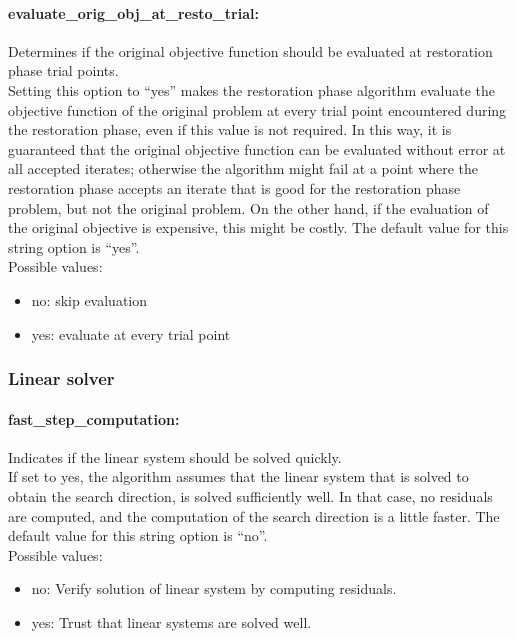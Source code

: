 \paragraph{evaluate\_orig\_obj\_at\_resto\_trial:} Determines if the original objective function should be evaluated at restoration phase trial points. $\;$ \\
 Setting this option to ``yes'' makes the
restoration phase algorithm evaluate the
objective function of the original problem at
every trial point encountered during the
restoration phase, even if this value is not
required.  In this way, it is guaranteed that the
original objective function can be evaluated
without error at all accepted iterates; otherwise
the algorithm might fail at a point where the
restoration phase accepts an iterate that is good
for the restoration phase problem, but not the
original problem.  On the other hand, if the
evaluation of the original objective is
expensive, this might be costly.
The default value for this string option is ``yes''.
\\ 
Possible values:
\begin{itemize}
   \item no: skip evaluation
   \item yes: evaluate at every trial point
\end{itemize}

\subsubsection{Linear solver}

\paragraph{fast\_step\_computation:} Indicates if the linear system should be solved quickly. $\;$ \\
 If set to yes, the algorithm assumes that the
linear system that is solved to obtain the search
direction, is solved sufficiently well. In that
case, no residuals are computed, and the
computation of the search direction is a little
faster.
The default value for this string option is ``no''.
\\ 
Possible values:
\begin{itemize}
   \item no: Verify solution of linear system by computing
residuals.
   \item yes: Trust that linear systems are solved well.
\end{itemize}

